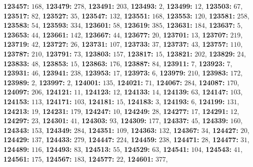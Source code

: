 \textsf{\bfseries 123457:} $168$, \textsf{\bfseries 123479:} $278$, \textsf{\bfseries 123491:} $203$, \textsf{\bfseries 123493:} $2$, \textsf{\bfseries 123499:} $12$, \textsf{\bfseries 123503:} $67$, \textsf{\bfseries 123517:} $82$, \textsf{\bfseries 123527:} $35$, \textsf{\bfseries 123547:} $132$, \textsf{\bfseries 123551:} $168$, \textsf{\bfseries 123553:} $120$, \textsf{\bfseries 123581:} $258$, \textsf{\bfseries 123583:} $54$, \textsf{\bfseries 123593:} $334$, \textsf{\bfseries 123601:} $58$, \textsf{\bfseries 123619:} $385$, \textsf{\bfseries 123631:} $184$, \textsf{\bfseries 123637:} $5$, \textsf{\bfseries 123653:} $44$, \textsf{\bfseries 123661:} $142$, \textsf{\bfseries 123667:} $44$, \textsf{\bfseries 123677:} $20$, \textsf{\bfseries 123701:} $13$, \textsf{\bfseries 123707:} $219$, \textsf{\bfseries 123719:} $42$, \textsf{\bfseries 123727:} $26$, \textsf{\bfseries 123731:} $107$, \textsf{\bfseries 123733:} $37$, \textsf{\bfseries 123737:} $43$, \textsf{\bfseries 123757:} $110$, \textsf{\bfseries 123787:} $210$, \textsf{\bfseries 123791:} $73$, \textsf{\bfseries 123803:} $157$, \textsf{\bfseries 123817:} $15$, \textsf{\bfseries 123821:} $202$, \textsf{\bfseries 123829:} $24$, \textsf{\bfseries 123833:} $48$, \textsf{\bfseries 123853:} $15$, \textsf{\bfseries 123863:} $176$, \textsf{\bfseries 123887:} $84$, \textsf{\bfseries 123911:} $7$, \textsf{\bfseries 123923:} $7$, \textsf{\bfseries 123931:} $46$, \textsf{\bfseries 123941:} $238$, \textsf{\bfseries 123953:} $17$, \textsf{\bfseries 123973:} $6$, \textsf{\bfseries 123979:} $210$, \textsf{\bfseries 123983:} $172$, \textsf{\bfseries 123989:} $2$, \textsf{\bfseries 123997:} $2$, \textsf{\bfseries 124001:} $135$, \textsf{\bfseries 124021:} $71$, \textsf{\bfseries 124067:} $284$, \textsf{\bfseries 124087:} $170$, \textsf{\bfseries 124097:} $206$, \textsf{\bfseries 124121:} $11$, \textsf{\bfseries 124123:} $12$, \textsf{\bfseries 124133:} $14$, \textsf{\bfseries 124139:} $63$, \textsf{\bfseries 124147:} $103$, \textsf{\bfseries 124153:} $113$, \textsf{\bfseries 124171:} $103$, \textsf{\bfseries 124181:} $15$, \textsf{\bfseries 124183:} $3$, \textsf{\bfseries 124193:} $6$, \textsf{\bfseries 124199:} $131$, \textsf{\bfseries 124213:} $19$, \textsf{\bfseries 124231:} $179$, \textsf{\bfseries 124247:} $10$, \textsf{\bfseries 124249:} $28$, \textsf{\bfseries 124277:} $17$, \textsf{\bfseries 124291:} $12$, \textsf{\bfseries 124297:} $23$, \textsf{\bfseries 124301:} $41$, \textsf{\bfseries 124303:} $93$, \textsf{\bfseries 124309:} $177$, \textsf{\bfseries 124337:} $45$, \textsf{\bfseries 124339:} $160$, \textsf{\bfseries 124343:} $153$, \textsf{\bfseries 124349:} $284$, \textsf{\bfseries 124351:} $109$, \textsf{\bfseries 124363:} $132$, \textsf{\bfseries 124367:} $34$, \textsf{\bfseries 124427:} $20$, \textsf{\bfseries 124429:} $137$, \textsf{\bfseries 124433:} $279$, \textsf{\bfseries 124447:} $224$, \textsf{\bfseries 124459:} $238$, \textsf{\bfseries 124471:} $28$, \textsf{\bfseries 124477:} $31$, \textsf{\bfseries 124489:} $116$, \textsf{\bfseries 124493:} $83$, \textsf{\bfseries 124513:} $55$, \textsf{\bfseries 124529:} $63$, \textsf{\bfseries 124541:} $104$, \textsf{\bfseries 124543:} $41$, \textsf{\bfseries 124561:} $175$, \textsf{\bfseries 124567:} $183$, \textsf{\bfseries 124577:} $22$, \textsf{\bfseries 124601:} $377$, 
